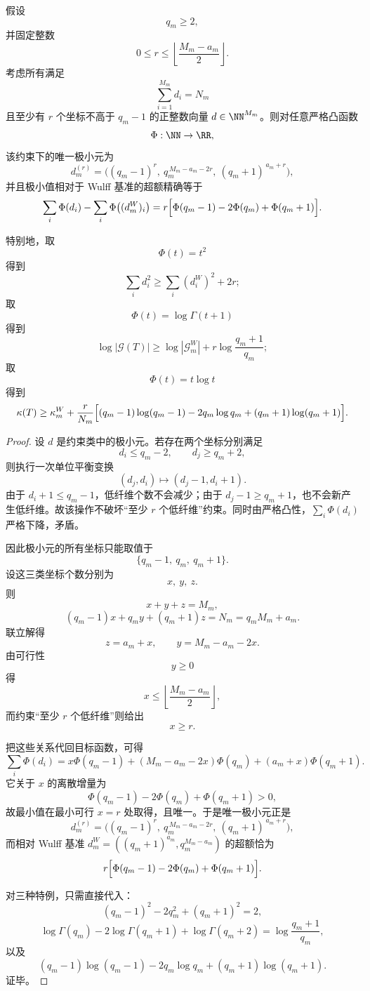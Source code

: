 \begin{theorem}[低纤维异常税的一般公式]\label{thm:xi-time-part9xaa-lowfiber-anomaly-tax}
假设
\[
q_m\ge 2,
\]
并固定整数
\[
0\le r\le \left\lfloor \frac{M_m-a_m}{2}\right\rfloor.
\]
考虑所有满足
\[
\sum_{i=1}^{M_m}d_i=N_m
\]
且至少有 \(r\) 个坐标不高于 \(q_m-1\) 的正整数向量 \(d\in\NN^{M_m}\)。则对任意严格凸函数
\[
\Phi:\NN\to\RR,
\]
该约束下的唯一极小元为
\[
d_m^{(r)}=\bigl((q_m-1)^r,\ q_m^{\,M_m-a_m-2r},\ (q_m+1)^{\,a_m+r}\bigr),
\]
并且极小值相对于 Wulff 基准的超额精确等于
\[
\sum_i \Phi(d_i)-\sum_i \Phi\bigl((d_m^{W})_i\bigr)
=
r\Bigl[\Phi(q_m-1)-2\Phi(q_m)+\Phi(q_m+1)\Bigr].
\]

特别地，取
\[
\Phi(t)=t^2
\]
得到
\[
\sum_i d_i^2\ge \sum_i (d_i^{W})^2+2r;
\]
取
\[
\Phi(t)=\log\Gamma(t+1)
\]
得到
\[
\log|\mathcal G(T)|\ge \log|\mathcal G_m^{W}|+r\log\frac{q_m+1}{q_m};
\]
取
\[
\Phi(t)=t\log t
\]
得到
\[
\kappa(T)\ge \kappa_m^{W}
+
\frac r{N_m}\Bigl[(q_m-1)\log(q_m-1)-2q_m\log q_m+(q_m+1)\log(q_m+1)\Bigr].
\]
\end{theorem}
\begin{proof}
设 \(d\) 是约束类中的极小元。若存在两个坐标分别满足
\[
d_i\le q_m-2,
\qquad
d_j\ge q_m+2,
\]
则执行一次单位平衡变换
\[
(d_j,d_i)\mapsto (d_j-1,d_i+1).
\]
由于 \(d_i+1\le q_m-1\)，低纤维个数不会减少；由于 \(d_j-1\ge q_m+1\)，也不会新产生低纤维。故该操作不破坏“至少 \(r\) 个低纤维”约束。同时由严格凸性，\(\sum_i \Phi(d_i)\) 严格下降，矛盾。

因此极小元的所有坐标只能取值于
\[
\{q_m-1,\ q_m,\ q_m+1\}.
\]
设这三类坐标个数分别为
\[
x,\ y,\ z.
\]
则
\[
x+y+z=M_m,
\]
\[
(q_m-1)x+q_my+(q_m+1)z=N_m=q_mM_m+a_m.
\]
联立解得
\[
z=a_m+x,
\qquad
y=M_m-a_m-2x.
\]
由可行性
\[
y\ge 0
\]
得
\[
x\le \left\lfloor\frac{M_m-a_m}{2}\right\rfloor,
\]
而约束“至少 \(r\) 个低纤维”则给出
\[
x\ge r.
\]

把这些关系代回目标函数，可得
\[
\sum_i \Phi(d_i)
=
x\Phi(q_m-1)+(M_m-a_m-2x)\Phi(q_m)+(a_m+x)\Phi(q_m+1).
\]
它关于 \(x\) 的离散增量为
\[
\Phi(q_m-1)-2\Phi(q_m)+\Phi(q_m+1)>0,
\]
故最小值在最小可行 \(x=r\) 处取得，且唯一。于是唯一极小元正是
\[
d_m^{(r)}=\bigl((q_m-1)^r,\ q_m^{\,M_m-a_m-2r},\ (q_m+1)^{\,a_m+r}\bigr),
\]
而相对 Wulff 基准 \(d_m^W=((q_m+1)^{a_m},q_m^{M_m-a_m})\) 的超额恰为
\[
r\Bigl[\Phi(q_m-1)-2\Phi(q_m)+\Phi(q_m+1)\Bigr].
\]

对三种特例，只需直接代入：
\[
(q_m-1)^2-2q_m^2+(q_m+1)^2=2,
\]
\[
\log\Gamma(q_m)-2\log\Gamma(q_m+1)+\log\Gamma(q_m+2)
=
\log\frac{q_m+1}{q_m},
\]
以及
\[
(q_m-1)\log(q_m-1)-2q_m\log q_m+(q_m+1)\log(q_m+1).
\]
证毕。
\end{proof}

